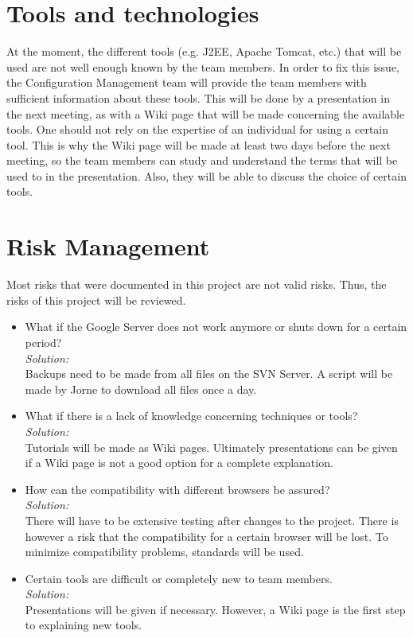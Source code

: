 \documentclass[a4paper, 12pt]{article}
\begin{document}
	\section{Tools and technologies}
At the moment, the different tools (e.g. J2EE, Apache Tomcat, etc.) that will be used are not well enough known by the team members. In order to fix this issue, the Configuration Management team will provide the team members with sufficient information about these tools. This will be done by a presentation in the next meeting, as with a Wiki page that will be made concerning the available tools. One should not rely on the expertise of an individual for using a certain tool. This is why the Wiki page will be made at least two days before the next meeting, so the team members can study and understand the terms that will be used to in the presentation. Also, they will be able to discuss the choice of certain tools.

	\section{Risk Management}
Most risks that were documented in this project are not valid risks. Thus, the risks of this project will be reviewed.
		\begin{itemize}
			\item What if the Google Server does not work anymore or shuts down for a certain period? \\
\textit{Solution:} \\
Backups need to be made from all files on the SVN Server. A script will be made by Jorne to download all files once a day.
			\item What if there is a lack of knowledge concerning techniques or tools? \\
\textit{Solution:} \\
Tutorials will be made as Wiki pages. Ultimately presentations can be given if a Wiki page is not a good option for a complete explanation.
			\item How can the compatibility with different browsers be assured? \\
\textit{Solution:} \\
There will have to be extensive testing after changes to the project. There is however a risk that the compatibility for a certain browser will be lost. To minimize compatibility problems, standards will be used.
			\item Certain tools are difficult or completely new to team members. \\
\textit{Solution:} \\
Presentations will be given if necessary. However, a Wiki page is the first step to explaining new tools.

			
	


		\end{itemize}
\end{document}
